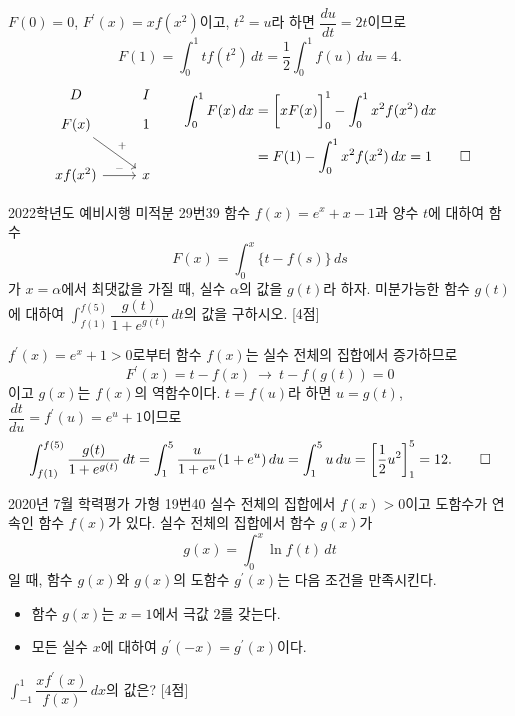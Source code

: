 \documentclass{article}
\begin{document}
\begin{sol}
	$F(0)=0$, $F^{\prime}(x)=xf(x^2)$이고, $t^2=u$라 하면 $\dfrac{du}{dt}=2t$이므로
	\[
		F(1)=\int_0^1tf(t^2)\,dt=\frac{1}{2}\int_0^1f(u)\,du=4.
	\]
	\[
		\begin{tikzcd}
			D & I \\[-12pt]
			F(x) \arrow[rd, "+"] & 1 \\
			xf(x^2) \arrow[r, "-"] & x
		\end{tikzcd}\qquad\begin{aligned}
			\int_0^1F(x)\,dx&=\biggl[xF(x)\biggr]_0^1-\int_0^1x^2f(x^2)\,dx\\[3pt]
			&=F(1)-\int_0^1x^2f(x^2)\,dx=1\qed
		\end{aligned}
	\]
\end{sol}

\newpage
\begin{prob}{2022학년도 예비시행 미적분 29번}{39}
	함수 $f(x)=e^x+x-1$과 양수 $t$에 대하여 함수
	\[
		F(x)=\int_0^x\{t-f(s)\}\,ds
	\]
	가 $x=\alpha$에서 최댓값을 가질 때, 실수 $\alpha$의 값을 $g(t)$라 하자. 미분가능한 함수 $g(t)$에 대하여 $\displaystyle\int_{f(1)}^{f(5)}\dfrac{g(t)}{1+e^{g(t)}}\,dt$의 값을 구하시오. [4점]
\end{prob}

\begin{sol}
	$f^{\prime}(x)=e^x+1>0$로부터 함수 $f(x)$는 실수 전체의 집합에서 증가하므로
	\[
		F^{\prime}(x)=t-f(x)~\longrightarrow~t-f(g(t))=0
	\]
	이고 $g(x)$는 $f(x)$의 역함수이다. $t=f(u)$라 하면 $u=g(t)$, $\dfrac{dt}{du}=f^{\prime}(u)=e^u+1$이므로
	\[
		\int_{f(1)}^{f(5)}\dfrac{g(t)}{1+e^{g(t)}}\,dt=\int_1^5\frac{u}{1+e^u}(1+e^u)\,du=\int_1^5u\,du=\biggl[\frac{1}{2}u^2\biggr]_1^5=12.\qed
	\]
\end{sol}

\newpage
\begin{prob}{2020년 7월 학력평가 가형 19번}{40}
	실수 전체의 집합에서 $f(x)>0$이고 도함수가 연속인 함수 $f(x)$가 있다. 실수 전체의 집합에서 함수 $g(x)$가
	\[
		g(x)=\int_0^x\ln f(t)\,dt
	\]
	일 때, 함수 $g(x)$와 $g(x)$의 도함수 $g^{\prime}(x)$는 다음 조건을 만족시킨다.
	\begin{hint}
		\begin{itemize}
			\item[(가)] 함수 $g(x)$는 $x=1$에서 극값 $2$를 갖는다.
			\item[(나)] 모든 실수 $x$에 대하여 $g^{\prime}(-x)=g^{\prime}(x)$이다.
		\end{itemize}
	\end{hint}
	$\displaystyle\int_{-1}^1\dfrac{xf^{\prime}(x)}{f(x)}\,dx$의 값은? [4점]
\end{prob}
\end{document}

